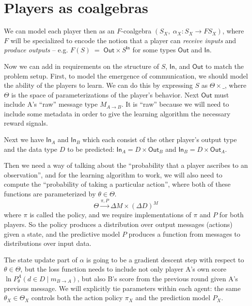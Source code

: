 \documentclass{article}
\theoremstyle{definition}
\begin{document}
\section{Players as coalgebras}

We can model each player then as an $F$-coalgebra
$(S_X,\;\alpha_X\colon S_X\longrightarrow F S_X)$, where $F$ will be specialized to encode the notion that a player can \emph{receive inputs} and \emph{produce outputs} -- e.g. $F(S)\;=\;\mathsf{Out}\times S^{\mathsf{In}}$ for some types $\mathsf{Out}$ and $\mathsf{In}$.

Now we can add in requirements on the structure of $S$, $\mathsf{In}$, and $\mathsf{Out}$ to match the problem setup. First, to model the emergence of communication, we should model the ability of the players to learn. We can do this by expressing $S$ as $\Theta \times \_$, where $\Theta$ is the space of parameterizations of the player's behavior. Next $\mathsf{Out}$ must include A's ``raw'' message type $M_{A\rightarrow B}$. It is ``raw'' because we will need to include some metadata in order to give the learning algorithm the necessary reward signals.

Next we have $\mathsf{In}_A$ and $\mathsf{In}_B$ which each consist of the other player's output type and the data type $D$ to be predicted: $\mathsf{In}_A=D \times \mathsf{Out}_B$ and $\mathsf{In}_B=D \times \mathsf{Out}_A$.

Then we need a way of talking about the ``probability that a player ascribes to an observation'', and for the learning algorithm to work, we will also need to compute the ``probability of taking a particular action'', where both of these functions are parameterized by $\theta \in \Theta$.
$$
\Theta \xrightarrow{\pi, P} \Delta M \times (\Delta D)^M
$$ where $\pi$ is called the policy, and we require implementations of $\pi$ and $P$ for both players. So the policy produces a distribution over output messages (actions) given a state, and the predictive model $P$ produces a function from messages to distributions over input data.

The state update part of $\alpha$ is going to be a gradient descent step with respect to $\theta \in \Theta$, but the loss function needs to include not only player A's own score $\ln P_\theta^A(d \in D \mid m_{B \rightarrow A})$, but also B's score from the previous round given A's previous message. We will explicitly tie parameters within each agent: the same $\theta_X\in\Theta_X$ controls both the action policy $\pi_X$ and the prediction model $P_X$.
\end{document}
